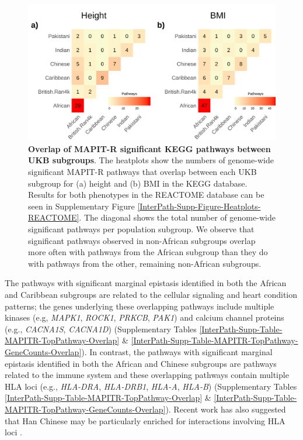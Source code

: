 \documentclass[12pt,a4paper]{article}
\begin{document}
\begin{figure}[htb]
\centering
\includegraphics[scale=.225]{Images/Main/InterPath_Main_Figure_Heatplots_KEGG_vs4.png}
\caption[TBD]{\textbf{Overlap of MAPIT-R significant KEGG pathways between UKB subgroups}. The heatplots show the numbers of genome-wide significant MAPIT-R pathways that overlap between each UKB subgroup for (a) height and (b) BMI in the KEGG database. Results for both phenotypes in the REACTOME database can be seen in Supplementary Figure \ref{InterPath-Supp-Figure-Heatplots-REACTOME}. The diagonal shows the total number of genome-wide significant pathways per population subgroup. We observe that significant pathways observed in non-African subgroups overlap more often with pathways from the African subgroup than they do with pathways from the other, remaining non-African subgroups.}
\label{InterPath-Main-Figure-Heatplots-KEGG}
\end{figure}

The pathways with significant marginal epistasis identified in both the African and Caribbean subgroups are related to the cellular signaling and heart condition patterns; the genes underlying these overlapping pathways include multiple kinases (e.g, {\emph{MAPK1}}, {\emph{ROCK1}}, {\emph{PRKCB}}, {\emph{PAK1}}) and calcium channel proteins (e.g., {\emph{CACNA1S}}, {\emph{CACNA1D}}) (Supplementary Tables \ref{InterPath-Supp-Table-MAPITR-TopPathway-Overlap} \& \ref{InterPath-Supp-Table-MAPITR-TopPathway-GeneCounts-Overlap}). In contrast, the pathways with significant marginal epistasis identified in both the African and Chinese subgroups are pathways related to the immune system and these overlapping pathways contain multiple HLA loci (e.g., {\emph{HLA-DRA}}, {\emph{HLA-DRB1}}, {\emph{HLA-A}}, {\emph{HLA-B}})  (Supplementary Tables \ref{InterPath-Supp-Table-MAPITR-TopPathway-Overlap} \& \ref{InterPath-Supp-Table-MAPITR-TopPathway-GeneCounts-Overlap}). Recent work has also suggested that Han Chinese may be particularly enriched for interactions involving HLA loci \citep{Deng2020}. 
\end{document}
